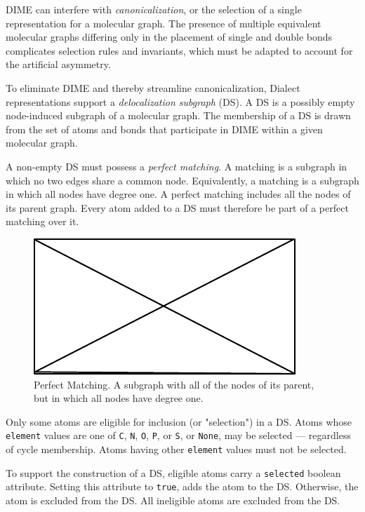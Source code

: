 \documentclass{article}
\def\ttt{\texttt}
\begin{document}
DIME can interfere with \textit{canonicalization}, or the selection of a single representation for a molecular graph. The presence of multiple equivalent molecular graphs differing only in the placement of single and double bonds complicates selection rules and invariants, which must be adapted to account for the artificial asymmetry.

To eliminate DIME and thereby streamline canonicalization, Dialect representations support a \textit{delocalization subgraph} (DS). A DS is a possibly empty node-induced subgraph of a molecular graph. The membership of a DS is drawn from the set of atoms and bonds that participate in DIME within a given molecular graph.

A non-empty DS must possess a \textit{perfect matching}. A matching is a subgraph in which no two edges share a common node. Equivalently, a matching is a subgraph in which all nodes have degree one. A perfect matching includes all the nodes of its parent graph. Every atom added to a DS must therefore be part of a perfect matching over it.

\begin{figure}
    \centering
    \includegraphics{filler}
    \caption{Perfect Matching. A subgraph with all of the nodes of its parent, but in which all nodes have degree one.}
    \label{fig:perfect-matching}
\end{figure}

Only some atoms are eligible for inclusion (or "selection") in a DS. Atoms whose \ttt{element} values are one of \ttt{C}, \ttt{N}, \ttt{O}, \ttt{P}, or \ttt{S}, or \ttt{None}, may be selected --- regardless of cycle membership. Atoms having other \ttt{element} values must not be selected.

To support the construction of a DS, eligible atoms carry a \ttt{selected} boolean attribute. Setting this attribute to \ttt{true}, adds the atom to the DS. Otherwise, the atom is excluded from the DS. All ineligible atoms are excluded from the DS.
\end{document}
